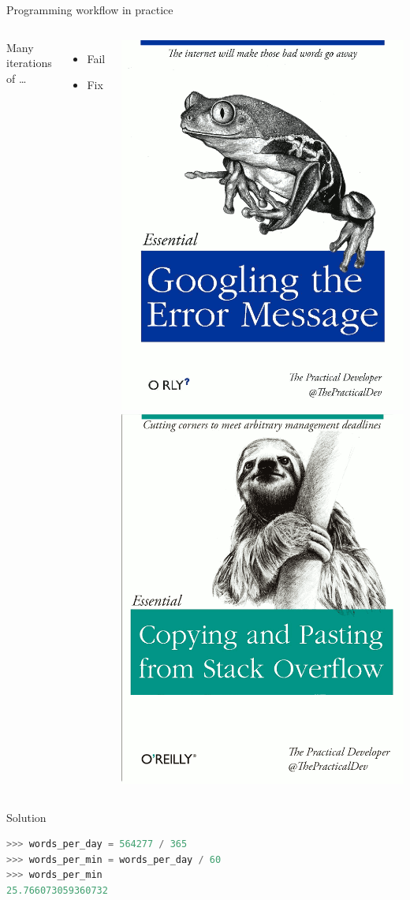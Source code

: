 \documentclass[aspectratio=169,usenames,dvipsnames]{beamer}
\begin{document}
\begin{frame}{Programming workflow in practice}
	\begin{columns}
			Many iterations of \dots
			\begin{itemize}
				\item Fail
				\item Fix
			\end{itemize}

			\includegraphics[width=0.45\linewidth]{fig/googling}
			\includegraphics[width=0.45\linewidth]{fig/stackoverflow}
	\end{columns}
\end{frame}


\begin{frame}[fragile]{Solution}
\begin{lstlisting}[language=python]
>>> words_per_day = 564277 / 365
>>> words_per_min = words_per_day / 60
>>> words_per_min
25.766073059360732
\end{lstlisting}
\end{frame}
\end{document}
